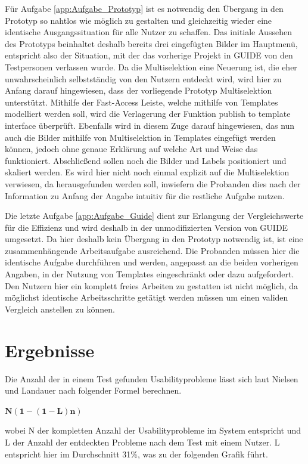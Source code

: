 Für Aufgabe \ref{app:Aufgabe_Prototyp} ist es notwendig den Übergang in den Prototyp so nahtlos wie möglich zu gestalten und gleichzeitig wieder eine identische Ausgangssituation für alle Nutzer zu schaffen.
Das initiale Aussehen des Prototyps beinhaltet deshalb bereits drei eingefügten Bilder im Hauptmenü, entspricht also der Situation, mit der das vorherige Projekt in GUIDE von den Testpersonen verlassen wurde.
Da die Multiselektion eine Neuerung ist, die eher unwahrscheinlich selbstständig von den Nutzern entdeckt wird, wird hier zu Anfang darauf hingewiesen, dass der vorliegende Prototyp Multiselektion unterstützt.
Mithilfe der Fast-Access Leiste, welche mithilfe von Templates modelliert werden soll, wird die Verlagerung der Funktion \glqq publish to template interface\grqq{} überprüft.
Ebenfalls wird in diesem Zuge darauf hingewiesen, das nun auch die Bilder mithilfe von Multiselektion in Templates eingefügt werden können, jedoch ohne genaue Erklärung auf welche Art und Weise das funktioniert.
Abschließend sollen noch die Bilder und Labels positioniert und skaliert werden.
Es wird hier nicht noch einmal explizit auf die Multiselektion verwiesen, da herausgefunden werden soll, inwiefern die Probanden dies nach der Information zu Anfang der Angabe intuitiv für die restliche Aufgabe nutzen.

Die letzte Aufgabe \ref{app:Aufgabe_Guide} dient zur Erlangung der Vergleichswerte für die Effizienz und wird deshalb in der unmodifizierten Version von GUIDE umgesetzt.
Da hier deshalb kein Übergang in den Prototyp notwendig ist, ist eine zusammenhängende Arbeitsaufgabe ausreichend.
Die Probanden müssen hier die identische Aufgabe durchführen und werden, angepasst an die beiden vorherigen Angaben, in der Nutzung von Templates eingeschränkt oder dazu aufgefordert.
Den Nutzern hier ein komplett freies Arbeiten zu gestatten ist nicht möglich, da möglichst identische Arbeitsschritte getätigt werden müssen um einen validen Vergleich anstellen zu können.

\section {Ergebnisse}
Die Anzahl der in einem Test gefunden Usabilityprobleme lässt sich laut Nielsen und Landauer nach folgender Formel berechnen.

\begin{center}
$\mathbf{N (1-(1- L ) n )}$ 
\end{center}

wobei N der kompletten Anzahl der Usabilityprobleme im System entspricht und L der Anzahl der entdeckten Probleme nach dem Test mit einem Nutzer.
L entspricht hier im Durchschnitt 31\%, was zu der folgenden Grafik führt.  \cite{Nielsen.1993}

